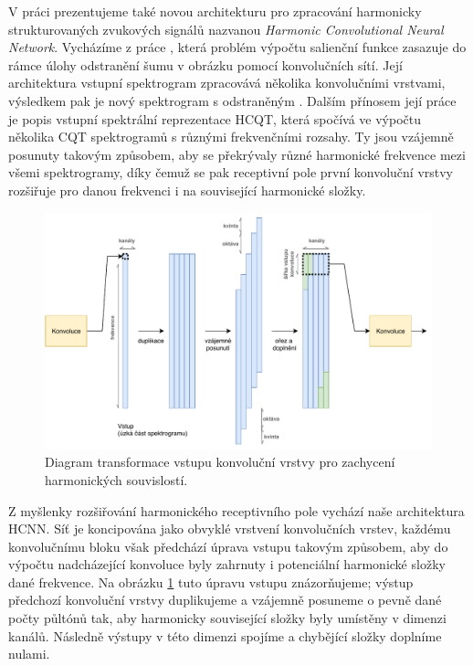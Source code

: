 V práci prezentujeme také novou architekturu pro zpracování harmonicky strukturovaných zvukových signálů nazvanou \emph{Harmonic Convolutional Neural Network}. Vycházíme z práce \cite{Bittner2017}, která problém výpočtu salienční funkce zasazuje do rámce úlohy odstranění šumu v obrázku pomocí konvolučních sítí. Její architektura vstupní spektrogram zpracovává několika konvolučními vrstvami, výsledkem pak je nový spektrogram s odstraněným . Dalším přínosem její práce je popis vstupní spektrální reprezentace HCQT, která spočívá ve výpočtu několika CQT spektrogramů s různými frekvenčními rozsahy. Ty jsou vzájemně posunuty takovým způsobem, aby se překrývaly různé harmonické frekvence mezi všemi spektrogramy, díky čemuž se pak receptivní pole první konvoluční vrstvy rozšiřuje pro danou frekvenci i na související harmonické složky. 

\begin{figure}[h]\centering
    \includegraphics[width=\textwidth,height=\textheight,keepaspectratio]{../img/hcnn_harmonic_stacking}
\caption{Diagram transformace vstupu konvoluční vrstvy pro zachycení harmonických souvislostí.}\label{obr:hcnn_harmonic_stacking}
\end{figure}

Z myšlenky rozšiřování harmonického receptivního pole vychází naše architektura HCNN. Síť je koncipována jako obvyklé vrstvení konvolučních vrstev, každému konvolučnímu bloku však předchází úprava vstupu takovým způsobem, aby do výpočtu nadcházející konvoluce byly zahrnuty i potenciální harmonické složky dané frekvence. Na obrázku \ref{obr:hcnn_harmonic_stacking} tuto úpravu vstupu znázorňujeme; výstup předchozí konvoluční vrstvy duplikujeme a vzájemně posuneme o pevně dané počty půltónů tak, aby harmonicky související složky byly umístěny  v dimenzi kanálů. Následně výstupy v této dimenzi spojíme a chybějící složky doplníme nulami.


